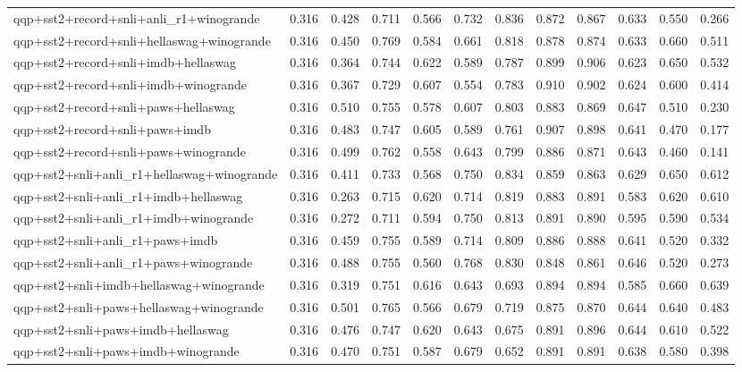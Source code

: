 \begin{table}[t]
\begin{tabular}{lrrrrrrrrrrr}
    qqp+sst2+record+snli+anli\_r1+winogrande & 0.316 & 0.428 & 0.711 & 0.566 & 0.732 & 0.836 & 0.872 & 0.867 & 0.633 & 0.550 & 0.266 \\
    qqp+sst2+record+snli+hellaswag+winogrande & 0.316 & 0.450 & 0.769 & 0.584 & 0.661 & 0.818 & 0.878 & 0.874 & 0.633 & 0.660 & 0.511 \\
    qqp+sst2+record+snli+imdb+hellaswag & 0.316 & 0.364 & 0.744 & 0.622 & 0.589 & 0.787 & 0.899 & 0.906 & 0.623 & 0.650 & 0.532 \\
    qqp+sst2+record+snli+imdb+winogrande & 0.316 & 0.367 & 0.729 & 0.607 & 0.554 & 0.783 & 0.910 & 0.902 & 0.624 & 0.600 & 0.414 \\
    qqp+sst2+record+snli+paws+hellaswag & 0.316 & 0.510 & 0.755 & 0.578 & 0.607 & 0.803 & 0.883 & 0.869 & 0.647 & 0.510 & 0.230 \\
    qqp+sst2+record+snli+paws+imdb & 0.316 & 0.483 & 0.747 & 0.605 & 0.589 & 0.761 & 0.907 & 0.898 & 0.641 & 0.470 & 0.177 \\
    qqp+sst2+record+snli+paws+winogrande & 0.316 & 0.499 & 0.762 & 0.558 & 0.643 & 0.799 & 0.886 & 0.871 & 0.643 & 0.460 & 0.141 \\
    qqp+sst2+snli+anli\_r1+hellaswag+winogrande & 0.316 & 0.411 & 0.733 & 0.568 & 0.750 & 0.834 & 0.859 & 0.863 & 0.629 & 0.650 & 0.612 \\
    qqp+sst2+snli+anli\_r1+imdb+hellaswag & 0.316 & 0.263 & 0.715 & 0.620 & 0.714 & 0.819 & 0.883 & 0.891 & 0.583 & 0.620 & 0.610 \\
    qqp+sst2+snli+anli\_r1+imdb+winogrande & 0.316 & 0.272 & 0.711 & 0.594 & 0.750 & 0.813 & 0.891 & 0.890 & 0.595 & 0.590 & 0.534 \\
    qqp+sst2+snli+anli\_r1+paws+imdb & 0.316 & 0.459 & 0.755 & 0.589 & 0.714 & 0.809 & 0.886 & 0.888 & 0.641 & 0.520 & 0.332 \\
    qqp+sst2+snli+anli\_r1+paws+winogrande & 0.316 & 0.488 & 0.755 & 0.560 & 0.768 & 0.830 & 0.848 & 0.861 & 0.646 & 0.520 & 0.273 \\
    qqp+sst2+snli+imdb+hellaswag+winogrande & 0.316 & 0.319 & 0.751 & 0.616 & 0.643 & 0.693 & 0.894 & 0.894 & 0.585 & 0.660 & 0.639 \\
    qqp+sst2+snli+paws+hellaswag+winogrande & 0.316 & 0.501 & 0.765 & 0.566 & 0.679 & 0.719 & 0.875 & 0.870 & 0.644 & 0.640 & 0.483 \\
    qqp+sst2+snli+paws+imdb+hellaswag & 0.316 & 0.476 & 0.747 & 0.620 & 0.643 & 0.675 & 0.891 & 0.896 & 0.644 & 0.610 & 0.522 \\
    qqp+sst2+snli+paws+imdb+winogrande & 0.316 & 0.470 & 0.751 & 0.587 & 0.679 & 0.652 & 0.891 & 0.891 & 0.638 & 0.580 & 0.398 \\

\end{tabular}
\end{table}
